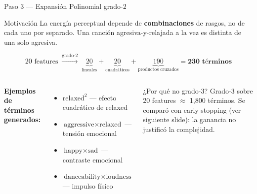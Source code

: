 \documentclass[aspectratio=169]{beamer}
\begin{document}
\begin{frame}{Paso 3 — Expansión Polinomial grado-2}

  \begin{block}{Motivación}
    La energía perceptual depende de \textbf{combinaciones} de rasgos, no de cada uno por separado. Una canción agresiva-y-relajada a la vez es distinta de una solo agresiva.
  \end{block}

  \bigskip
  \[
    20 \text{ features} \;\xrightarrow{\text{grado-2}}\;
    \underbrace{20}_{\text{lineales}} +
    \underbrace{20}_{\text{cuadráticos}} +
    \underbrace{190}_{\text{productos cruzados}} =
    \mathbf{230 \text{ términos}}
  \]

  \bigskip
  \begin{columns}
      \textbf{Ejemplos de términos generados:}
      \small
      \begin{itemize}
        \item $\text{relaxed}^2$ — efecto cuadrático de relaxed
        \item $\text{aggressive} \times \text{relaxed}$ — tensión emocional
        \item $\text{happy} \times \text{sad}$ — contraste emocional
        \item $\text{danceability} \times \text{loudness}$ — impulso físico
      \end{itemize}

      \begin{exampleblock}{¿Por qué no grado-3?}
        \small
        Grado-3 sobre 20 features $\approx$ 1{,}800 términos. Se comparó con early stopping (ver siguiente slide): la ganancia no justificó la complejidad.
      \end{exampleblock}
  \end{columns}

\end{frame}
\end{document}
